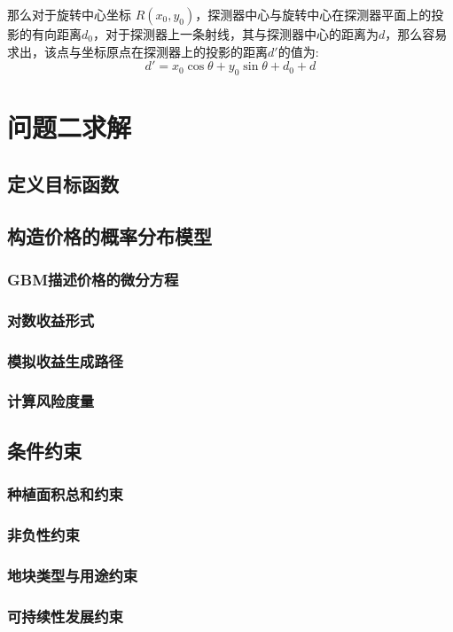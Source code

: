 \documentclass[12pt]{ctexart}
\begin{document}
	那么对于旋转中心坐标 $R(x_0, y_0)$，探测器中心与旋转中心在探测器平面上的投影的有向距离$d_0$，对于探测器上一条射线，其与探测器中心的距离为$d$，那么容易求出，该点与坐标原点在探测器上的投影的距离$d'$的值为:
	\begin{equation*}
		d' = x_0 \cos \theta + y_0 \sin \theta + d_0 + d
	\end{equation*}
	
	\section{问题二求解}
	\subsection{定义目标函数}
	\subsection{构造价格的概率分布模型}
	\subsubsection{GBM描述价格的微分方程}
	\subsubsection{对数收益形式}
	\subsubsection{模拟收益生成路径}
	\subsubsection{计算风险度量}
	\subsection{条件约束}
	\subsubsection{种植面积总和约束}
	\subsubsection{非负性约束}
	\subsubsection{地块类型与用途约束}
	\subsubsection{可持续性发展约束}
\end{document}
